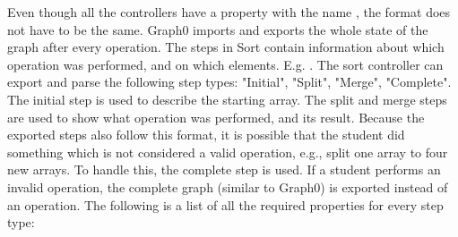 Even though all the controllers have a property with the name , the format does not have to be the same. Graph0 imports and exports the whole state of the graph after every operation. The steps in Sort contain information about which operation was performed, and on which elements. E.g. . The sort controller can export and parse the following step types: "Initial", "Split", "Merge", "Complete". The initial step is used to describe the starting array. The split and merge steps are used to show what operation was performed, and its result. Because the exported steps also follow this format, it is possible that the student did something which is not considered a valid operation, e.g., split one array to four new arrays. To handle this, the complete step is used. If a student performs an invalid operation, the complete graph (similar to Graph0) is exported instead of an operation. The following is a list of all the required properties for every step type:
